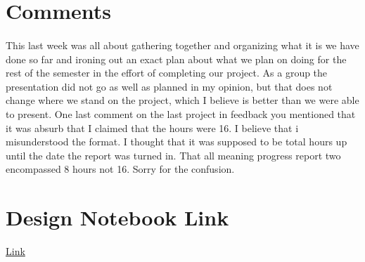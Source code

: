 \documentclass[12pt]{report}
\begin{document}
\newpage

\section*{Comments}
	\paragraph*{}
		This last week was all about gathering together and organizing what it is we have done so 
		far and ironing out an exact plan about what we plan on doing for the rest of the semester 
		in the effort of completing our project.  As a group the presentation did not go as well as
		planned in my opinion, but that does not change where we stand on the project, which I 
		believe is better than we were able to present.  One last comment on the last project
		in feedback you mentioned that it was absurb that I claimed that the hours were 16.  I
		believe that i misunderstood the format.  I thought that it was supposed to be total hours
		up until the date the report was turned in.  That all meaning progress report two 
		encompassed 8 hours not 16.  Sorry for the confusion.

\section*{Design Notebook Link}
	\begin{center}
		\href{https://docs.google.com/document/d/1_15R62LK1jZ8SYRuCrb-5IObISIdbLSfoH2bRU7464c/edit?usp=sharing}{Link}
	\end{center}
\end{document}
